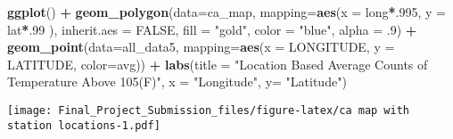 \documentclass[]{article}
\newenvironment{Shaded}{\begin{snugshade}}{\end{snugshade}}
\newcommand{\DataTypeTok}[1]{\textcolor[rgb]{0.13,0.29,0.53}{#1}}
\newcommand{\DecValTok}[1]{\textcolor[rgb]{0.00,0.00,0.81}{#1}}
\newcommand{\FloatTok}[1]{\textcolor[rgb]{0.00,0.00,0.81}{#1}}
\newcommand{\KeywordTok}[1]{\textcolor[rgb]{0.13,0.29,0.53}{\textbf{#1}}}
\newcommand{\NormalTok}[1]{#1}
\newcommand{\OperatorTok}[1]{\textcolor[rgb]{0.81,0.36,0.00}{\textbf{#1}}}
\newcommand{\OtherTok}[1]{\textcolor[rgb]{0.56,0.35,0.01}{#1}}
\newcommand{\StringTok}[1]{\textcolor[rgb]{0.31,0.60,0.02}{#1}}
\begin{document}
\begin{Shaded}
\begin{Highlighting}[]
\KeywordTok{ggplot}\NormalTok{() }\OperatorTok{+}
\StringTok{  }\KeywordTok{geom_polygon}\NormalTok{(}\DataTypeTok{data=}\NormalTok{ca_map, }\DataTypeTok{mapping=}\KeywordTok{aes}\NormalTok{(}\DataTypeTok{x =}\NormalTok{ long}\OperatorTok{*}\NormalTok{.}\DecValTok{995}\NormalTok{, }\DataTypeTok{y =}\NormalTok{ lat}\OperatorTok{*}\NormalTok{.}\DecValTok{99}\NormalTok{ ), }\DataTypeTok{inherit.aes =} \OtherTok{FALSE}\NormalTok{, }\DataTypeTok{fill =} \StringTok{"gold"}\NormalTok{, }\DataTypeTok{color =} \StringTok{"blue"}\NormalTok{, }\DataTypeTok{alpha =} \FloatTok{.9}\NormalTok{) }\OperatorTok{+}
\StringTok{  }\KeywordTok{geom_point}\NormalTok{(}\DataTypeTok{data=}\NormalTok{all_data5, }\DataTypeTok{mapping=}\KeywordTok{aes}\NormalTok{(}\DataTypeTok{x =}\NormalTok{ LONGITUDE, }\DataTypeTok{y =}\NormalTok{ LATITUDE, }\DataTypeTok{color=}\NormalTok{avg)) }\OperatorTok{+}\StringTok{ }\KeywordTok{labs}\NormalTok{(}\DataTypeTok{title =} \StringTok{"Location Based Average Counts of Temperature Above 105(F)"}\NormalTok{, }\DataTypeTok{x =} \StringTok{"Longitude"}\NormalTok{, }\DataTypeTok{y=} \StringTok{"Latitude"}\NormalTok{)}
\end{Highlighting}
\end{Shaded}

\texttt{[image: Final\_Project\_Submission\_files/figure-latex/ca map with station locations-1.pdf]}
\end{document}
